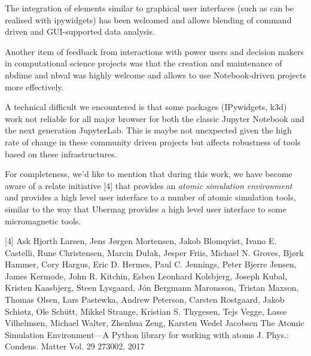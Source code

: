 \documentclass{deliverablereport}
\begin{document}
The integration of elements similar to graphical user interfaces (such
as can be realised with ipywidgets) has been welcomed and allows
blending of command driven and GUI-supported data analysis.

Another item of feedback from interactions with power users and
decision makers in computational science projects was that the
creation and maintenance of nbdime and nbval was highly welcome and
allows to use Notebook-driven projects more effectively.

A technical difficult we encountered is that some packages
(IPywidgets, k3d) work not reliable for all major browser for both the
classic Jupyter Notebook and the next generation JupyterLab. This is
maybe not unexpected given the high rate of change in these community
driven projects but affects robustness of tools based on these
infrastructures.

For completeness, we'd like to mention that during this work, we have
become aware of a relate initiative [4] that provides an \emph{atomic
  simulation environment} and provides a high level user interface to
a number of atomic simulation tools, similar to the way that Ubermag
provides a high level user interface to some micromagnetic tools.


[4] Ask Hjorth Larsen, Jens Jørgen Mortensen, Jakob Blomqvist,
Ivano E. Castelli, Rune Christensen, Marcin Dułak, Jesper Friis,
Michael N. Groves, Bjørk Hammer, Cory Hargus, Eric D. Hermes,
Paul C. Jennings, Peter Bjerre Jensen, James Kermode, John R. Kitchin,
Esben Leonhard Kolsbjerg, Joseph Kubal, Kristen Kaasbjerg,
Steen Lysgaard, Jón Bergmann Maronsson, Tristan Maxson, Thomas Olsen,
Lars Pastewka, Andrew Peterson, Carsten Rostgaard, Jakob Schiøtz,
Ole Schütt, Mikkel Strange, Kristian S. Thygesen, Tejs Vegge,
Lasse Vilhelmsen, Michael Walter, Zhenhua Zeng, Karsten Wedel Jacobsen
The Atomic Simulation Environment—A Python library for working with atoms
J. Phys.: Condens. Matter Vol. 29 273002, 2017
\end{document}
